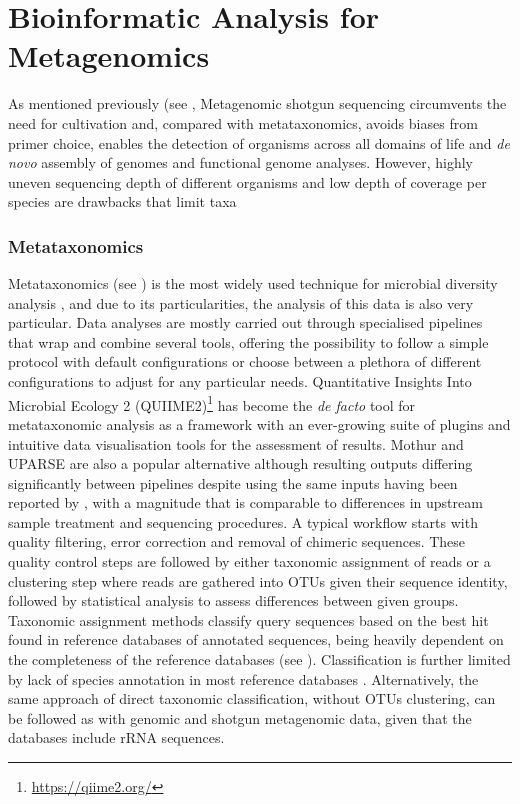 \section{Bioinformatic Analysis for Metagenomics} \label{sec:_intro_metagenomics_bioinfo}

As mentioned previously (see , Metagenomic shotgun sequencing circumvents the need for cultivation and, compared with metataxonomics, avoids biases from primer choice, enables the detection of organisms across all domains of life and \textit{de novo} assembly of genomes and functional genome analyses. However, highly uneven sequencing depth of different organisms and low depth of coverage per species are drawbacks that limit taxa

\subsubsection{Metataxonomics} \label{ssec:_intro_metataxonomics_bioinfo}

Metataxonomics (see ) is the most widely used technique for microbial diversity analysis \citep{hilton_metataxonomic_2016}, and due to its particularities, the analysis of this data is also very particular. Data analyses are mostly carried out through specialised pipelines that wrap and combine several tools, offering the possibility to follow a simple protocol with default configurations or choose between a plethora of different configurations to adjust for any particular needs. Quantitative Insights Into Microbial Ecology 2 (QUIIME2)\footnote{\url{https://qiime2.org/}} \citep{bolyen_reproducible_2019} has become the \textit{de facto} tool for metataxonomic analysis as a framework with an ever-growing suite of plugins and intuitive data visualisation tools for the assessment of results. Mothur \citep{schloss_introducing_2009} and UPARSE \citep{edgar_uparse_2013} are also a popular alternative although resulting outputs differing significantly between pipelines despite using the same inputs having been reported by \cite{marizzoni_comparison_2020}, with a magnitude that is comparable to differences in upstream sample treatment and sequencing procedures.  A typical workflow starts with quality filtering, error correction and removal of chimeric sequences. These quality control steps are followed by either taxonomic assignment of reads or a clustering step where reads are gathered into \ac{OTUs} given their sequence identity, followed by statistical analysis to assess differences between given groups. Taxonomic assignment methods classify query sequences based on the best hit found in reference databases of annotated sequences, being heavily dependent on the completeness of the reference databases (see ). Classification is further limited by lack of species annotation in most reference databases \citep{westcott_novo_2015}. Alternatively, the same approach of direct taxonomic classification, without \ac{OTUs} clustering, can be followed as with genomic and shotgun metagenomic data, given that the databases include \ac{rRNA} sequences.


